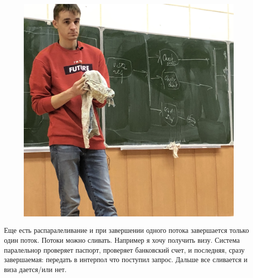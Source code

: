 \documentclass[12pt; a4paper]{book}
\theoremstyle{plain} %
\theoremstyle{defenition}
\theoremstyle{remark}
\begin{document}
\begin{figure}[!htbp]
\includegraphics[angle=0, width=\textwidth]{IMG/IMG_0826.jpg} \\
\end{figure}

Еще есть распаралеливание и при завершении одного потока завершается только один поток. Потоки можно сливать. 
Например я хочу получить визу. Система паралельнор проверяет паспорт, проверяет банковский счет, и последняя, сразу завершаемая: передать в интерпол что поступил запрос. Дальше все сливается и виза дается/или нет.\\



\newpage
\end{document}
